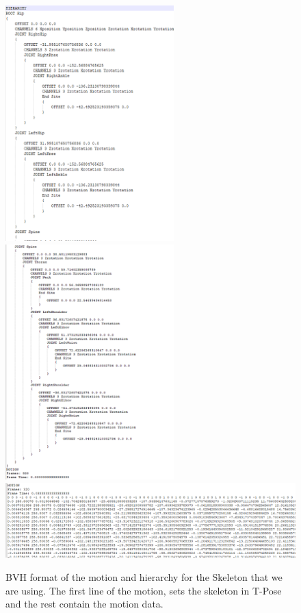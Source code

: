 \begin{figure}[htp]
    \centering
    \includegraphics[width=6.5cm]{figures/Implementation/bvh1.png}%
    \qquad
    \includegraphics[width=6.5cm]{figures/Implementation/bvh2.png}%
    \qquad
    \includegraphics[width=1\textwidth]{figures/Implementation/bvh3.png}%
    \captionsetup{labelformat=empty}
    \caption{BVH format of the motion and hierarchy for the Skeleton that we are using. The first line of the motion, sets the skeleton in T-Pose and the rest contain the motion data.}
\end{figure}

